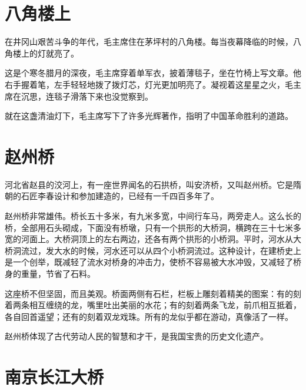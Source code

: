 \documentclass[12pt,UTF-8,openany]{ctexbook}
\begin{document}
\chapter{八角楼上}

\begin{Large}
    
    在井冈山艰苦斗争的年代，毛主席住在茅坪村的八角楼。每当夜幕降临的时候，八角楼上的灯就亮了。
    
    这是个寒冬腊月的深夜，毛主席穿着单军衣，披着薄毯子，坐在竹椅上写文章。他右手握着笔，左手轻轻地拨了拨灯芯，灯光更加明亮了。凝视着这星星之火，毛主席在沉思，连毯子滑落下来也没觉察到。
    
    就在这盏清油灯下，毛主席写下了许多光辉著作，指明了中国革命胜利的道路。
    
\end{Large}

\chapter{赵州桥}

\begin{Large}
    
    河北省赵县的洨河上，有一座世界闻名的石拱桥，叫安济桥，又叫赵州桥。它是隋朝的石匠李春设计和参加建造的，已经有一千四百多年了。
    
    赵州桥非常雄伟。桥长五十多米，有九米多宽，中间行车马，两旁走人。这么长的桥，全部用石头砌成，下面没有桥墩，只有一个拱形的大桥洞，横跨在三十七米多宽的河面上。大桥洞顶上的左右两边，还各有两个拱形的小桥洞。平时，河水从大桥洞流过，发大水的时候，河水还可以从四个小桥洞流过。这种设计，在建桥史上是一个创举，既减轻了流水对桥身的冲击力，使桥不容易被大水冲毁，又减轻了桥身的重量，节省了石料。
    
    这座桥不但坚固，而且美观。桥面两侧有石栏，栏板上雕刻着精美的图案：有的刻着两条相互缠绕的龙，嘴里吐出美丽的水花；有的刻着两条飞龙，前爪相互抵着，各自回首遥望；还有的刻着双龙戏珠。所有的龙似乎都在游动，真像活了一样。
    
    赵州桥体现了古代劳动人民的智慧和才干，是我国宝贵的历史文化遗产。
    
\end{Large}

\chapter{南京长江大桥}
\end{document}
